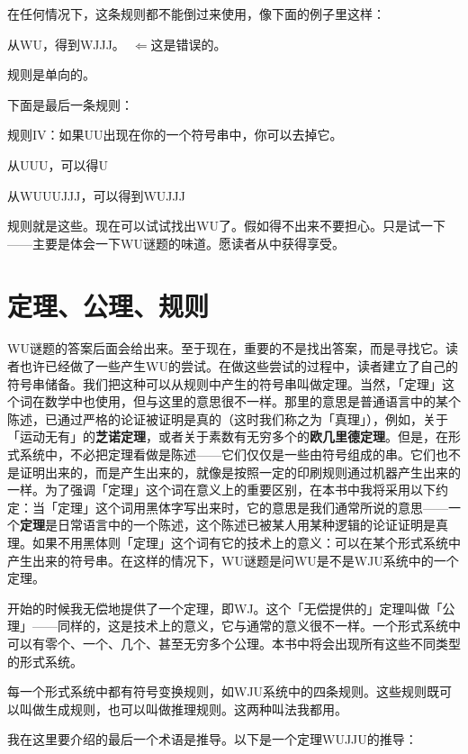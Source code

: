 \documentclass[
  12pt,
  twoside,
  openright,
  oldfontcommands,
]{memoir}
\renewenvironment{quote}
  {\begin{mdframed}[style=gebquote]\small}
  {\end{mdframed}}
\newcommand{\heititext}[1]{{\heifamily\bfseries #1}}
\begin{document}
在任何情况下，这条规则都不能倒过来使用，像下面的例子里这样：

\begin{quote}
从WU，得到WJJJ。　$\Leftarrow$这是错误的。
\end{quote}

规则是单向的。

下面是最后一条规则：

规则IV：如果UU出现在你的一个符号串中，你可以去掉它。

\begin{quote}
从UUU，可以得U

从WUUUJJJ，可以得到WUJJJ
\end{quote}

规则就是这些。现在可以试试找出WU了。假如得不出来不要担心。只是试一下------主要是体会一下WU谜题的味道。愿读者从中获得享受。

\section{定理、公理、规则}

WU谜题的答案后面会给出来。至于现在，重要的不是找出答案，而是寻找它。读者也许已经做了一些产生WU的尝试。在做这些尝试的过程中，读者建立了自己的符号串储备。我们把这种可以从规则中产生的符号串叫做定理。当然，「定理」这个词在数学中也使用，但与这里的意思很不一样。那里的意思是普通语言中的某个陈述，已通过严格的论证被证明是真的（这时我们称之为「真理」），例如，关于「运动无有」的\heititext{芝诺定理}，或者关于素数有无穷多个的\heititext{欧几里德定理}。但是，在形式系统中，不必把定理看做是陈述------它们仅仅是一些由符号组成的串。它们也不是证明出来的，而是产生出来的，就像是按照一定的印刷规则通过机器产生出来的一样。为了强调「定理」这个词在意义上的重要区别，在本书中我将采用以下约定：当「定理」这个词用黑体字写出来时，它的意思是我们通常所说的意思------一个\heititext{定理}是日常语言中的一个陈述，这个陈述已被某人用某种逻辑的论证证明是真理。如果不用黑体则「定理」这个词有它的技术上的意义：可以在某个形式系统中产生出来的符号串。在这样的情况下，WU谜题是问WU是不是WJU系统中的一个定理。

开始的时候我无偿地提供了一个定理，即WJ。这个「无偿提供的」定理叫做「公理」------同样的，这是技术上的意义，它与通常的意义很不一样。一个形式系统中可以有零个、一个、几个、甚至无穷多个公理。本书中将会出现所有这些不同类型的形式系统。

每一个形式系统中都有符号变换规则，如WJU系统中的四条规则。这些规则既可以叫做生成规则，也可以叫做推理规则。这两种叫法我都用。

我在这里要介绍的最后一个术语是推导。以下是一个定理WUJJU的推导：
\end{document}
